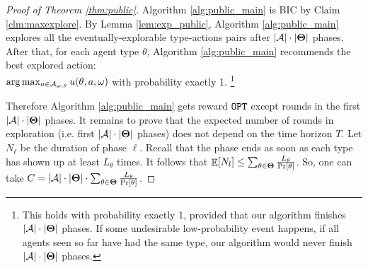 \begin{proof}[Proof of Theorem \ref{thm:public}]
Algorithm \ref{alg:public_main} is BIC  by Claim \ref{clm:maxexplore}. By Lemma \ref{lem:exp_public}, Algorithm \ref{alg:public_main} explores all the eventually-explorable type-actions pairs after $|\mathcal{A}|\cdot |\bold{\Theta}|$ phases.
After that, for each agent type $\theta$, Algorithm \ref{alg:public_main} recommends the best explored action: \\$ \arg\max_{a \in \mathcal{A}_{\omega,\theta}} u(\theta, a, \omega)$ with probability exactly 1.%
\footnote{This holds with probability exactly 1, provided that our algorithm finishes $|\mathcal{A}|\cdot |\bold{\Theta}|$  phases. If some undesirable low-probability event happens, \eg if all agents seen so far have had the same type, our algorithm would never finish $|\mathcal{A}|\cdot |\bold{\Theta}|$ phases.}

Therefore Algorithm \ref{alg:public_main} gets reward $\mathtt{OPT}$ except rounds in the first $|\mathcal{A}|\cdot |\bold{\Theta}|$ phases.  It remains to prove that the expected number of rounds in exploration (i.e. first $|\mathcal{A}|\cdot |\bold{\Theta}|$ phases) does not depend on the time horizon $T$. Let $N_\ell$ be the duration of phase $\ell$.
Recall that the phase ends as soon as each type has shown up at least $L_{\theta}$ times. It follows that
$ \mathop{\mathbb{E}}[N_l] \leq  \sum_{\theta\in\bold{\Theta}} \frac{L_{\theta}}{\Pr[\theta]}$.
So, one can take $C = |\mathcal{A}|\cdot |\bold{\Theta}|\cdot \sum_{\theta\in\bold{\Theta}} \frac{L_{\theta}}{\Pr[\theta]}$.
\end{proof}

